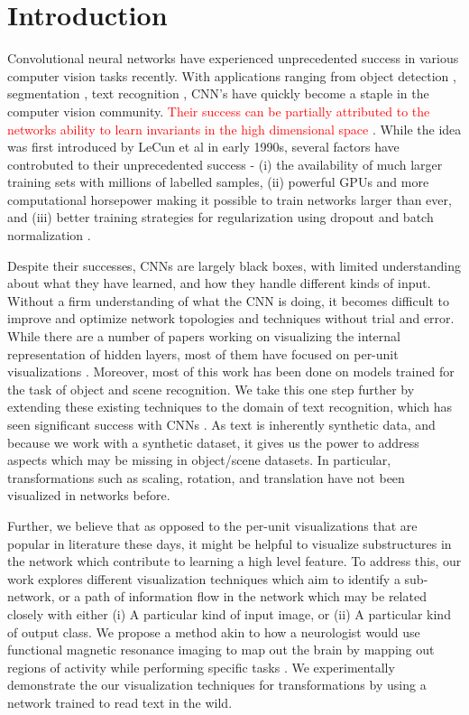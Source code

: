 \documentclass[10pt,twocolumn,letterpaper]{article}
\begin{document}
\section{Introduction}
Convolutional neural networks have experienced unprecedented success in various computer vision tasks recently.  With applications ranging from object detection \cite{krizhevskynips12}, segmentation \cite{DBLP:journals/corr/GirshickDDM13}, text recognition \cite{Jaderberg14d}, CNN's have quickly become a staple in the computer vision community. \textcolor{red}{Their success can be partially attributed to the networks ability to learn invariants in the high dimensional space \cite{krizhevskynips12}}. While the idea was first introduced by LeCun et al in early 1990s, several factors have controbuted to their unprecedented success - (i) the availability of much larger training sets with millions of labelled samples, (ii) powerful GPUs and more computational horsepower making it possible to train networks larger than ever, and (iii) better training strategies for regularization using dropout \cite{wan2013regularization} and batch normalization \cite{ioffe2015batch}.


Despite their successes, CNNs are largely black boxes, with limited understanding about what they have learned, and how they handle different kinds of input. Without a firm understanding of what the CNN is doing, it becomes difficult to improve and optimize network topologies and techniques without trial and error. While there are a number of papers working on visualizing the internal representation of hidden layers, most of them have focused on per-unit visualizations \cite{yosinski2015understanding,mahendran2015understanding,zhou2014object}. Moreover, most of this work has been done on models trained for the task of object and scene recognition. We take this one step further by extending these existing techniques to the domain of text recognition, which has seen significant success with CNNs \cite{Jaderberg14,Jaderberg14c,Jaderberg14d}. As text is inherently synthetic data, and because we work with a synthetic dataset, it gives us the power to address aspects which may be missing in object/scene datasets. In particular, transformations such as scaling, rotation, and translation have not been visualized in networks before.


Further, we believe that as opposed to the per-unit visualizations that are popular in literature these days, it might be helpful to visualize substructures in the network which contribute to learning a high level feature. To address this, our work explores different visualization techniques which aim to identify a sub-network, or a path of information flow in the network which may be related closely with either (i) A particular kind of input image, or (ii) A particular kind of output class. We propose a method akin to how a neurologist would use functional magnetic resonance imaging to map out the brain by mapping out regions of activity while performing specific tasks \cite{friston1998event}. We experimentally demonstrate the our visualization techniques for transformations by using a network trained to read text in the wild.
\end{document}
